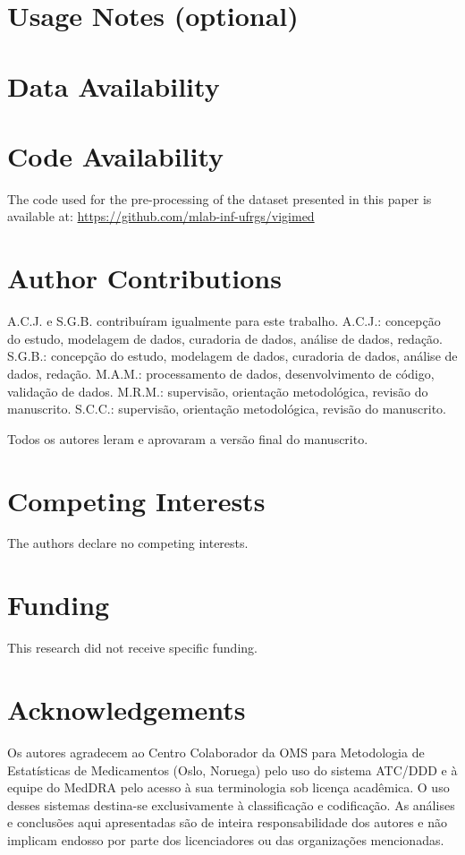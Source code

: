 \documentclass[12pt,a4paper]{article} %
\begin{document}
\section{Usage Notes (optional)}

\section{Data Availability}

\section*{Code Availability}

The code used for the pre-processing of the dataset presented in this paper is available at: \url{https://github.com/mlab-inf-ufrgs/vigimed}

\section*{Author Contributions}

A.C.J. e S.G.B. contribuíram igualmente para este trabalho. A.C.J.: concepção do estudo, modelagem de dados, curadoria de dados, análise de dados, redação. S.G.B.: concepção do estudo, modelagem de dados, curadoria de dados, análise de dados, redação. M.A.M.: processamento de dados, desenvolvimento de código, validação de dados. M.R.M.: supervisão, orientação metodológica, revisão do manuscrito. S.C.C.: supervisão, orientação metodológica, revisão do manuscrito.

Todos os autores leram e aprovaram a versão final do manuscrito.

\section*{Competing Interests}
The authors declare no competing interests.

\section*{Funding}

This research did not receive specific funding.

\section*{Acknowledgements}
Os autores agradecem ao Centro Colaborador da OMS para Metodologia de Estatísticas de Medicamentos (Oslo, Noruega) pelo uso do sistema ATC/DDD e à equipe do MedDRA pelo acesso à sua terminologia sob licença acadêmica. O uso desses sistemas destina-se exclusivamente à classificação e codificação. As análises e conclusões aqui apresentadas são de inteira responsabilidade dos autores e não implicam endosso por parte dos licenciadores ou das organizações mencionadas.


\end{document}
